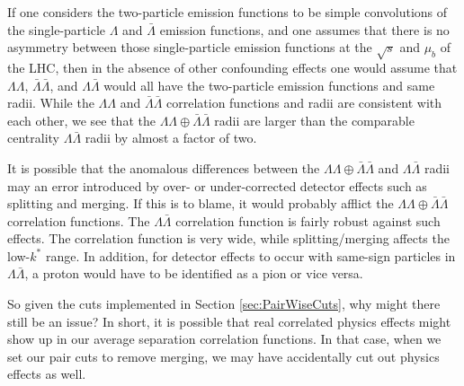 If one considers the two-particle emission functions to be simple convolutions of the single-particle $\Lambda$ and $\bar{\Lambda}$ emission functions, and one assumes that there is no asymmetry between those single-particle emission functions at the $\sqrt{s}$ and $\mu_b$ of the LHC, then in the absence of other confounding effects one would assume that $\Lambda\Lambda$, $\bar{\Lambda}\bar{\Lambda}$, and $\Lambda\bar{\Lambda}$ would all have the two-particle emission functions and same radii.
While the $\Lambda\Lambda$ and $\bar{\Lambda}\bar{\Lambda}$ correlation functions and radii are consistent with each other, we see that the $\Lambda\Lambda\oplus\bar{\Lambda}\bar{\Lambda}$ radii are larger than the comparable centrality $\Lambda\bar{\Lambda}$ radii by almost a factor of two.

It is possible that the anomalous differences between the $\Lambda\Lambda\oplus\bar{\Lambda}\bar{\Lambda}$ and $\Lambda\bar{\Lambda}$ radii may an error introduced by over- or under-corrected detector effects such as splitting and merging.
If this is to blame, it would probably afflict the $\Lambda\Lambda\oplus\bar{\Lambda}\bar{\Lambda}$ correlation functions.
The $\Lambda\bar{\Lambda}$ correlation function is fairly robust against such effects. 
The correlation function is very wide, while splitting/merging affects the low-$k^*$ range.
In addition, for detector effects to occur with same-sign particles in $\Lambda\bar{\Lambda}$, a proton would have to be identified as a pion or vice versa.

So given the cuts implemented in Section \ref{sec:PairWiseCuts}, why might there still be an issue?
In short, it is possible that real correlated physics effects might show up in our average separation correlation functions.
In that case, when we set our pair cuts to remove merging, we may have accidentally cut out physics effects as well.

